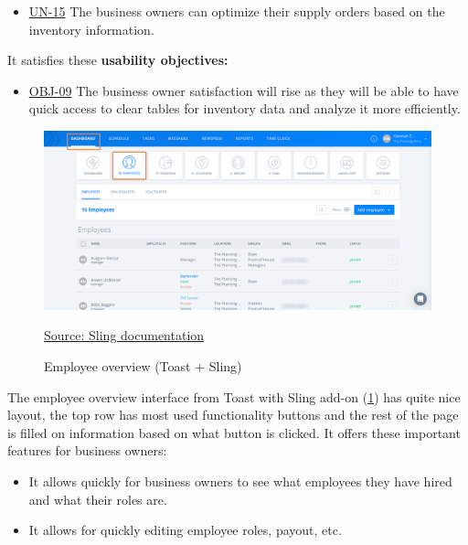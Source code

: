 \documentclass[]{VUMIFTemplateClass}
\begin{document}
\begin{itemize}
    \item \hyperref[UN-15]{UN-15} The business owners can optimize their supply orders based on the inventory information.
\end{itemize}

It satisfies these \textbf{usability objectives:}

\begin{itemize}
    \item \hyperref[OBJ-09]{OBJ-09} The business owner satisfaction will rise as they will be able to have quick access to clear tables for inventory data and analyze it more efficiently.
\end{itemize}



\begin{figure}[H]
    \centering
    \includegraphics[width=\textwidth]{docs/computer-interaction/1 assignment/images/examples/toast+Sling_employee_management.png}
    \caption{Employee overview (Toast + Sling)}
    \href{https://support.getsling.com/en/articles/8981593-sling-toast-admin-manual}{Source: Sling documentation}
    \label{fig:employee-overview}
\end{figure}

The employee overview interface from Toast with Sling add-on
(\ref{fig:employee-overview}) has quite nice layout, the top row has most used
functionality buttons and the rest of the page is filled on information based on
what button is clicked. It offers these important features for business owners:

\begin{itemize}
    \item It allows quickly for business owners to see what employees they have hired and what their roles are.
    \item It allows for quickly editing employee roles, payout, etc.
\end{itemize}
\end{document}
